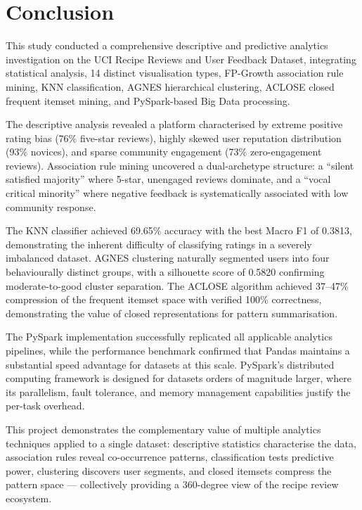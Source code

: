 \documentclass[12pt,a4paper]{article}
\begin{document}
\section{Conclusion}

This study conducted a comprehensive descriptive and predictive analytics investigation on the UCI Recipe Reviews and User Feedback Dataset, integrating statistical analysis, 14 distinct visualisation types, FP-Growth association rule mining, KNN classification, AGNES hierarchical clustering, ACLOSE closed frequent itemset mining, and PySpark-based Big Data processing.

The descriptive analysis revealed a platform characterised by extreme positive rating bias (76\% five-star reviews), highly skewed user reputation distribution (93\% novices), and sparse community engagement (73\% zero-engagement reviews). Association rule mining uncovered a dual-archetype structure: a ``silent satisfied majority'' where 5-star, unengaged reviews dominate, and a ``vocal critical minority'' where negative feedback is systematically associated with low community response.

The KNN classifier achieved 69.65\% accuracy with the best Macro F1 of 0.3813, demonstrating the inherent difficulty of classifying ratings in a severely imbalanced dataset. AGNES clustering naturally segmented users into four behaviourally distinct groups, with a silhouette score of 0.5820 confirming moderate-to-good cluster separation. The ACLOSE algorithm achieved 37--47\% compression of the frequent itemset space with verified 100\% correctness, demonstrating the value of closed representations for pattern summarisation.

The PySpark implementation successfully replicated all applicable analytics pipelines, while the performance benchmark confirmed that Pandas maintains a substantial speed advantage for datasets at this scale. PySpark's distributed computing framework is designed for datasets orders of magnitude larger, where its parallelism, fault tolerance, and memory management capabilities justify the per-task overhead.

This project demonstrates the complementary value of multiple analytics techniques applied to a single dataset: descriptive statistics characterise the data, association rules reveal co-occurrence patterns, classification tests predictive power, clustering discovers user segments, and closed itemsets compress the pattern space --- collectively providing a 360-degree view of the recipe review ecosystem.
\end{document}
